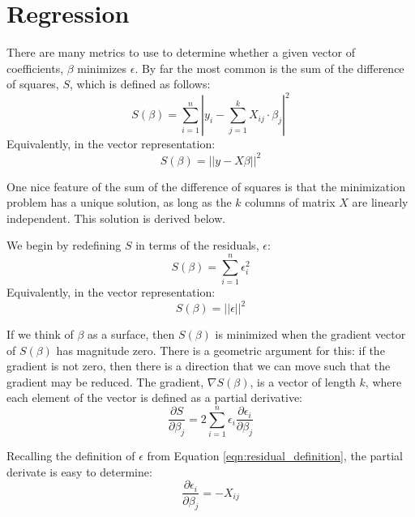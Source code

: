 \section{Regression}
\label{sec:regression}

There are many metrics to use to determine whether a given
vector of coefficients, $\beta$ minimizes $\epsilon$.
By far the most common is the sum of the difference
of squares, $S$, which is defined as follows:
\begin{equation}
  S(\beta) = \sum_{i = 1}^{n}\left|y_{i} - \sum_{j = 1}^{k}X_{ij}\cdot \beta_{j}\right|^2
\end{equation}
Equivalently, in the vector representation:
\begin{equation}
  S(\beta) = \left|\left|y - X\beta\right|\right|^2
\end{equation}

One nice feature of the sum of the difference of squares
is that the minimization problem has a unique solution, as
long as the $k$ columns of matrix $X$ are linearly independent.
This solution is derived below.

We begin by redefining $S$ in terms of the residuals, $\epsilon$:
\begin{equation}
  S(\beta) = \sum_{i = 1}^{n}\epsilon_{i}^{2}
\end{equation}
Equivalently, in the vector representation:
\begin{equation}
  S(\beta) = \left|\left|\epsilon\right|\right|^2
\end{equation}

If we think of $\beta$ as a surface, then
$S(\beta)$ is minimized when the gradient vector of $S(\beta)$ has magnitude
zero.  There is a geometric argument for this:
if the gradient is not zero, then there is a direction
that we can move such that the gradient may be reduced.
The gradient, $\nabla S(\beta)$, is a vector of length
$k$, where each element of the vector is defined 
as a partial derivative:
\begin{equation}
  \frac{\partial S}{\partial \beta_j} = 2 \sum_{i = 1}^{n} \epsilon_{i} \frac{\partial \epsilon_i}{\partial \beta_j}
\end{equation}

Recalling the definition of $\epsilon$ from Equation \ref{eqn:residual_definition},
the partial derivate is easy to determine:
\begin{equation}
  \frac{\partial \epsilon_i}{\partial \beta_j} = -X_{ij}
\end{equation}

